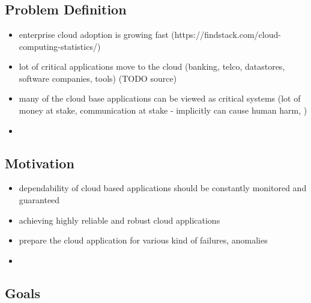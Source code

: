 \chapter{\bevezetes}

\section{Problem Definition}

\begin{itemize}
	\item enterprise cloud adoption is growing fast (https://findstack.com/cloud-computing-statistics/)
	\item lot of critical applications move to the cloud (banking, telco, datastores, software companies, tools) (TODO source)
	\item many of the cloud base applications can be viewed as critical systems (lot of money at stake, communication at stake - implicitly can cause human harm, \etc)
	\item \etc
\end{itemize}

\section{Motivation}

\begin{itemize}
	\item dependability of cloud based applications should be constantly monitored and guaranteed
	\item achieving highly reliable and robust cloud applications
	\item prepare the cloud application for various kind of failures, anomalies
	\item \etc
\end{itemize}

\section{Goals}

